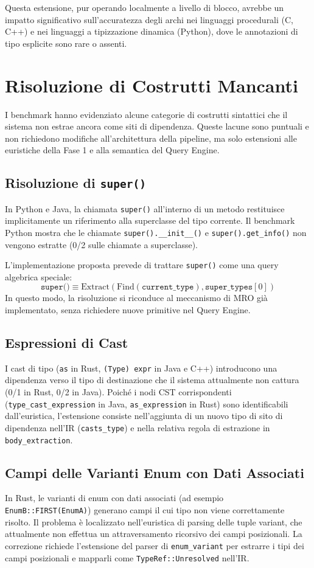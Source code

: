 Questa estensione, pur operando localmente a livello di blocco, avrebbe
un impatto significativo sull'accuratezza degli archi nei linguaggi
procedurali (C, C++) e nei linguaggi a tipizzazione dinamica (Python),
dove le annotazioni di tipo esplicite sono rare o assenti.

\section{Risoluzione di Costrutti Mancanti}
I benchmark hanno evidenziato alcune categorie di costrutti
sintattici che il sistema non estrae ancora come siti di dipendenza.
Queste lacune sono puntuali e non richiedono modifiche
all'architettura della pipeline, ma solo estensioni alle euristiche
della Fase 1 e alla semantica del Query Engine.

\subsection{Risoluzione di \texttt{super()}}
In Python e Java, la chiamata \texttt{super()} all'interno di un
metodo restituisce implicitamente un riferimento alla superclasse del
tipo corrente. Il benchmark Python mostra che le chiamate
\texttt{super().\_\_init\_\_()} e \texttt{super().get\_info()} non
vengono estratte (0/2 sulle chiamate a superclasse).

L'implementazione proposta prevede di trattare \texttt{super()} come
una query algebrica speciale:
$$\texttt{super()} \equiv
\text{Extract}(\text{Find}(\texttt{current\_type}), \texttt{super\_types}[0])$$
In questo modo, la risoluzione si riconduce al meccanismo di MRO già
implementato, senza richiedere nuove primitive nel Query Engine.

\subsection{Espressioni di Cast}
I cast di tipo (\texttt{as} in Rust, \texttt{(Type) expr} in Java e
C++) introducono una dipendenza verso il tipo di destinazione che il
sistema attualmente non cattura (0/1 in Rust, 0/2 in Java). Poiché i
nodi CST corrispondenti (\texttt{type\_cast\_expression} in Java,
\texttt{as\_expression} in Rust) sono identificabili dall'euristica,
l'estensione consiste nell'aggiunta di un nuovo tipo di sito di
dipendenza nell'IR (\texttt{casts\_type}) e nella relativa regola di
estrazione in \texttt{body\_extraction}.

\subsection{Campi delle Varianti Enum con Dati Associati}
In Rust, le varianti di enum con dati associati (ad esempio
\texttt{EnumB::FIRST(EnumA)}) generano campi il cui tipo non viene
correttamente risolto. Il problema è localizzato nell'euristica di
parsing delle tuple variant, che attualmente non effettua un
attraversamento ricorsivo dei campi posizionali. La correzione
richiede l'estensione del parser di \texttt{enum\_variant} per
estrarre i tipi dei campi posizionali e mapparli come
\texttt{TypeRef::Unresolved} nell'IR.

